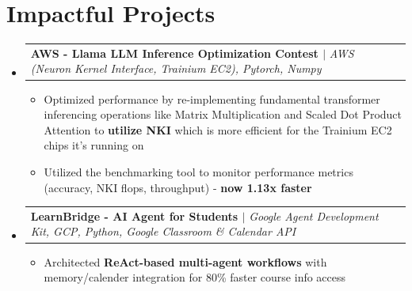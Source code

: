 \documentclass[letterpaper,11pt]{article}
\makeatletter
\newcommand{\resumeItem}[1]{
  \item\small{
    {#1 \vspace{-2pt}}
  }
}
\newcommand{\resumeProjectHeading}[2]{
    \item
    \begin{tabular*}{1.001\textwidth}{l@{\extracolsep{\fill}}r}
      \small#1 & \textbf{\small #2}\\
    \end{tabular*}\vspace{-7pt}
}
\newcommand{\resumeSubHeadingListStart}{\begin{itemize}[leftmargin=0.0in, label={}]}
\newcommand{\resumeSubHeadingListEnd}{\end{itemize}}
\newcommand{\resumeItemListStart}{\begin{itemize}}
\newcommand{\resumeItemListEnd}{\end{itemize}\vspace{-5pt}}
\makeatother
\begin{document}
\section{Impactful Projects}
    \vspace{-5pt}
    \resumeSubHeadingListStart
      \resumeProjectHeading
          {\textbf{AWS - Llama LLM Inference Optimization Contest \href{https://github.com/SachinVedGupta/nki-llama}\faExternalLink} $|$ \emph{AWS (Neuron Kernel Interface, Trainium EC2), Pytorch, Numpy}}{}
         \resumeItemListStart
            \resumeItem{Optimized performance by re-implementing fundamental transformer inferencing operations like Matrix Multiplication and Scaled Dot Product Attention to \textbf{utilize NKI} which is more efficient for the Trainium EC2 chips it's running on}
            \resumeItem{Utilized the benchmarking tool to monitor performance metrics (accuracy, NKI flops, throughput) - \textbf{now 1.13x faster}}
        \resumeItemListEnd
        \vspace{-13pt}
      \resumeProjectHeading
          {\textbf{LearnBridge - AI Agent for Students \href{https://github.com/SachinVedGupta/LearnBridge}\faExternalLink} $|$ \emph{Google Agent Development Kit, GCP, Python, Google Classroom \& Calendar API}}{}
         \resumeItemListStart
            \resumeItem{Architected \textbf{ReAct-based multi-agent workflows} with memory/calender integration for 80\% faster course info access}
        \resumeItemListEnd
    \resumeSubHeadingListEnd
\vspace{-8pt}


%
\end{document}
